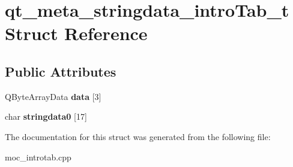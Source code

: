 \hypertarget{structqt__meta__stringdata__introTab__t}{}\section{qt\+\_\+meta\+\_\+stringdata\+\_\+intro\+Tab\+\_\+t Struct Reference}
\label{structqt__meta__stringdata__introTab__t}
\subsection*{Public Attributes}
\begin{DoxyCompactItemize}
\item 
\mbox{\label{structqt__meta__stringdata__introTab__t_adb86563bfaf47b86d105822d1da75661}} 
Q\+Byte\+Array\+Data {\bfseries data} \mbox{[}3\mbox{]}
\item 
\mbox{\label{structqt__meta__stringdata__introTab__t_af683b0579164a88d1289719f7a73e4f6}} 
char {\bfseries stringdata0} \mbox{[}17\mbox{]}
\end{DoxyCompactItemize}


The documentation for this struct was generated from the following file\+:\begin{DoxyCompactItemize}
\item 
moc\+\_\+introtab.\+cpp\end{DoxyCompactItemize}
